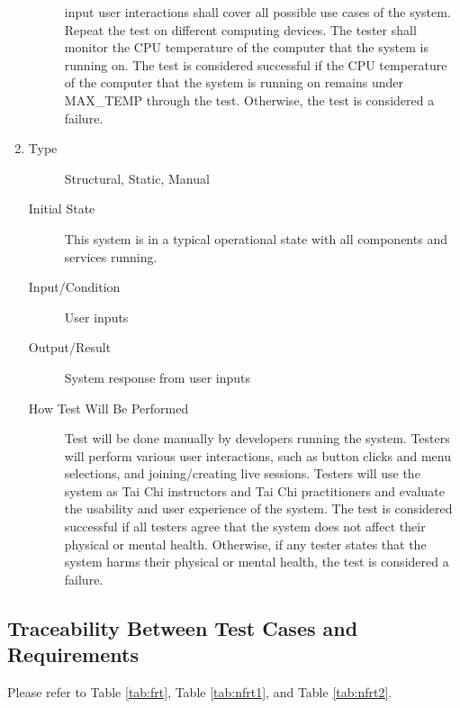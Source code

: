\documentclass[12pt, titlepage]{article}
\begin{document}
\begin{enumerate}[NFR-T1]
\begin{description}
    input user interactions shall cover all possible use cases of the system.
    Repeat the test on different computing devices. The tester shall monitor the
    CPU temperature of the computer that the system is running on. The test is
    considered successful if the CPU temperature of the computer that the system
    is running on remains under MAX\_TEMP through the test. Otherwise,
    the test is considered a failure.
  \end{description}
\item \label{NFRT30}
  \begin{description}
  \item[Type] Structural, Static, Manual
  \item[Initial State] This system is in a typical operational state with all
    components and services running.
  \item[Input/Condition] User inputs
  \item[Output/Result] System response from user inputs
  \item[How Test Will Be Performed] Test will be done manually by developers
    running the system. Testers will perform various user interactions, such as
    button clicks and menu selections, and joining/creating live sessions.
    Testers will use the system as Tai Chi instructors and Tai Chi practitioners
    and evaluate the usability and user experience of the system. The test is
    considered successful if all testers agree that the system does not affect
    their physical or mental health. Otherwise, if any tester states that the
    system harms their physical or mental health, the test is considered a
    failure.
  \end{description}
\end{enumerate}

\subsection{Traceability Between Test Cases and Requirements}

Please refer to Table \ref{tab:frt}, Table \ref{tab:nfrt1}, and Table \ref{tab:nfrt2}.
\end{document}
